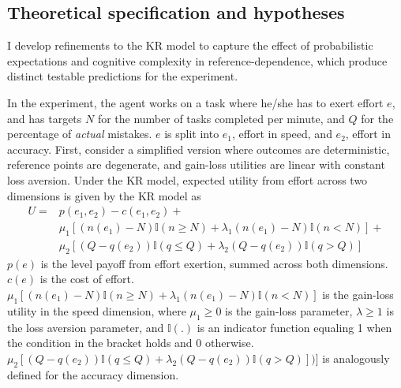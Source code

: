 \documentclass[
  12,
  letterpaper,
  DIV=11,
  numbers=noendperiod]{scrartcl}
\begin{document}
\subsection{Theoretical specification and
hypotheses}\label{theoretical-specification-and-hypotheses}

I develop refinements to the KR model to capture the effect of
probabilistic expectations and cognitive complexity in
reference-dependence, which produce distinct testable predictions for
the experiment.

In the experiment, the agent works on a task where he/she has to exert
effort \(e\), and has targets \(N\) for the number of tasks completed
per minute, and \(Q\) for the percentage of \emph{actual} mistakes.
\(e\) is split into \(e_1\), effort in speed, and \(e_2\), effort in
accuracy. First, consider a simplified version where outcomes are
deterministic, reference points are degenerate, and gain-loss utilities
are linear with constant loss aversion. Under the KR model, expected
utility from effort across two dimensions is given by the KR model as \[
\begin{aligned}
U = & p(e_1, e_2) - c(e_1, e_2) + \nonumber \\ 
    & \mu_1[(n(e_1)-N)\mathbb{I}(n \geq N) + \lambda_1(n(e_1)-N)\mathbb{I}(n<N)] + \nonumber \\
    & \mu_2[(Q-q(e_2))\mathbb{I}(q \leq Q) + \lambda_2(Q-q(e_2))\mathbb{I}(q>Q)]
\end{aligned}
\] \(p(e)\) is the level payoff from effort exertion, summed across both
dimensions. \(c(e)\) is the cost of effort.
\(\mu_1[(n(e_1)-N)\mathbb{I}(n \geq N) + \lambda_1(n(e_1)-N)\mathbb{I}(n<N)]\)
is the gain-loss utility in the speed dimension, where \(\mu_1 \geq 0\)
is the gain-loss parameter, \(\lambda \geq 1\) is the loss aversion
parameter, and \(\mathbb{I}(.)\) is an indicator function equaling 1
when the condition in the bracket holds and 0 otherwise.
\(\mu_2 [(Q-q(e_2))\mathbb{I}(q \leq Q) + \lambda_2(Q-q(e_2))\mathbb{I}(q>Q)])]\)
is analogously defined for the accuracy dimension.
\end{document}
